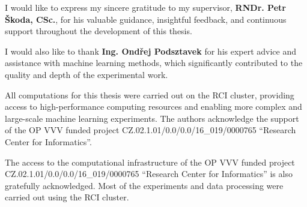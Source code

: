\documentclass[english,bachelor,oneside]{ctufit-thesis}
\begin{document}
\frontmatter\frontmatterinit

\thispagestyle{empty}\maketitle\thispagestyle{empty}\cleardoublepage



\imprintpage
\stopTOCentries

\begin{acknowledgmentpage}
    I would like to express my sincere gratitude to my supervisor, \textbf{RNDr. Petr Škoda, CSc.}, for his valuable guidance, insightful feedback, and continuous support throughout the development of this thesis.

    I would also like to thank \textbf{Ing. Ondřej Podsztavek} for his expert advice and assistance with machine learning methods, which significantly contributed to the quality and depth of the experimental work.

    All computations for this thesis were carried out on the RCI cluster, providing access to high-performance computing resources and enabling more complex and large-scale machine learning experiments.
    The authors acknowledge the support of the OP VVV funded project 
    CZ.02.1.01/0.0/0.0/16\_019/0000765 ``Research Center for Informatics''.

    The access to the computational infrastructure of the OP VVV funded project 
    CZ.02.1.01/0.0/0.0/16\_019/0000765 ``Research Center for Informatics'' is also gratefully acknowledged. Most of the experiments and data processing were carried out using the RCI cluster.


\end{acknowledgmentpage}
\end{document}
